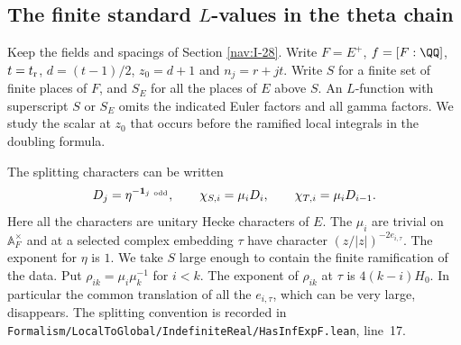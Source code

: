 \documentclass[a4paper,11pt]{article}
\theoremstyle{definition}
\theoremstyle{remark}
\newcommand{\srcloc}[2]{{\small\nolinkurl{#1.lean}}, line~#2}
\numberwithin{equation}{section}
\begin{document}
\subsection{The finite standard \texorpdfstring{\(L\)}{L}-values in the theta chain}\label{nav:VIII-03}
\label{sec:values171}

Keep the fields and spacings of Section \ref{nav:I-28}. Write
\(F=E^+\), \(f=[F:\QQ]\), \(t=t_{\rm r}\), \(d=(t-1)/2\),
\(z_0=d+1\) and \(n_j=r+jt\). Write \(S\) for a finite set of
finite places of \(F\), and \(S_E\) for all the places of \(E\)
above \(S\). An \(L\)-function with superscript \(S\) or
\(S_E\) omits the indicated Euler factors and all gamma factors.
We study the scalar at \(z_0\) that occurs before the ramified
local integrals in the doubling formula.

The splitting characters can be written
\[
 D_j=\eta^{-\mathbf1_{j\ {\rm odd}}},\qquad
 \chi_{S,i}=\mu_iD_i,\qquad \chi_{T,i}=\mu_iD_{i-1}.
\]
Here all the characters are unitary Hecke characters of \(E\).
The \(\mu_i\) are trivial on \(\mathbb A_F^\times\) and at a
selected complex embedding \(\tau\) have character
\((z/|z|)^{-2e_{i,\tau}}\). The exponent for \(\eta\) is \(1\).
We take \(S\) large enough to contain the finite ramification
of the data. Put \(\rho_{ik}=\mu_i\mu_k^{-1}\) for \(i<k\).
The exponent of \(\rho_{ik}\) at \(\tau\) is
\(4(k-i)H_0\). In particular the common translation of all
the \(e_{i,\tau}\), which can be very large, disappears.
The splitting convention is recorded in
\srcloc{Formalism/LocalToGlobal/IndefiniteReal/HasInfExpF}{17}.
\end{document}
